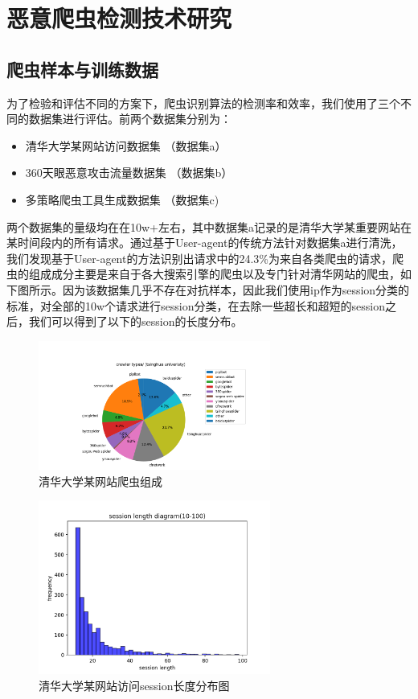 \documentclass[doctor,privacy,twoside]{buaa_mac}
\begin{document}
\chapter{恶意爬虫检测技术研究}

\section{爬虫样本与训练数据}
为了检验和评估不同的方案下，爬虫识别算法的检测率和效率，我们使用了三个不同的数据集进行评估。前两个数据集分别为：
\begin{itemize}
\item 清华大学某网站访问数据集 （数据集a）
\item 360天眼恶意攻击流量数据集 （数据集b）
\item 多策略爬虫工具生成数据集 （数据集c)
\end{itemize}

两个数据集的量级均在在10w+左右，其中数据集a记录的是清华大学某重要网站在某时间段内的所有请求。通过基于User-agent的传统方法针对数据集a进行清洗，我们发现基于User-agent的方法识别出请求中的24.3\%为来自各类爬虫的请求，爬虫的组成成分主要是来自于各大搜索引擎的爬虫以及专门针对清华网站的爬虫，如下图所示。因为该数据集几乎不存在对抗样本，因此我们使用ip作为session分类的标准，对全部的10w个请求进行session分类，在去除一些超长和超短的session之后，我们可以得到了以下的session的长度分布。

\centerline{}
\begin{figure}[!h]
  \centering
  \includegraphics[width=0.68\textwidth]{images/THU_crawler_types.png}
  \caption{清华大学某网站爬虫组成}
  \label{fig:logo}
\end{figure}
\centerline{}

\centerline{}
\begin{figure}[!h]
  \centering
  \includegraphics[width=0.68\textwidth]{images/session_len_10_100.png}
  \caption{清华大学某网站访问session长度分布图}
  \label{fig:logo}
\end{figure}
\centerline{}
\end{document}
